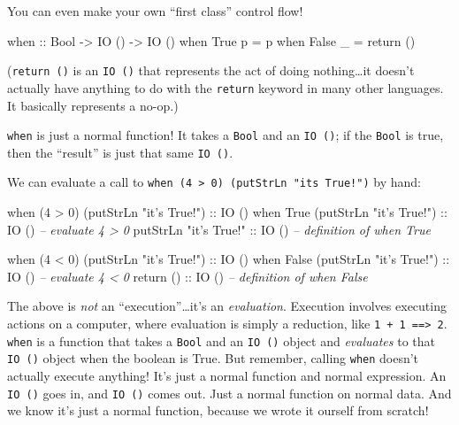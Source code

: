 \documentclass[]{article}
\newenvironment{Shaded}{\begin{snugshade}}{\end{snugshade}}
\newcommand{\CommentTok}[1]{\textcolor[rgb]{0.56,0.35,0.01}{\textit{#1}}}
\newcommand{\DataTypeTok}[1]{\textcolor[rgb]{0.13,0.29,0.53}{#1}}
\newcommand{\DecValTok}[1]{\textcolor[rgb]{0.00,0.00,0.81}{#1}}
\newcommand{\FunctionTok}[1]{\textcolor[rgb]{0.00,0.00,0.00}{#1}}
\newcommand{\NormalTok}[1]{#1}
\newcommand{\OtherTok}[1]{\textcolor[rgb]{0.56,0.35,0.01}{#1}}
\newcommand{\StringTok}[1]{\textcolor[rgb]{0.31,0.60,0.02}{#1}}
\begin{document}
You can even make your own ``first class'' control flow!

\begin{Shaded}
\begin{Highlighting}[]
\OtherTok{when ::} \DataTypeTok{Bool} \OtherTok{->} \DataTypeTok{IO}\NormalTok{ () }\OtherTok{->} \DataTypeTok{IO}\NormalTok{ ()}
\NormalTok{when }\DataTypeTok{True}\NormalTok{  p }\FunctionTok{=}\NormalTok{ p}
\NormalTok{when }\DataTypeTok{False}\NormalTok{ _ }\FunctionTok{=}\NormalTok{ return ()}
\end{Highlighting}
\end{Shaded}

(\texttt{return\ ()} is an \texttt{IO\ ()} that represents the act of doing
nothing\ldots{}it doesn't actually have anything to do with the \texttt{return}
keyword in many other languages. It basically represents a no-op.)

\texttt{when} is just a normal function! It takes a \texttt{Bool} and an
\texttt{IO\ ()}; if the \texttt{Bool} is true, then the ``result'' is just that
same \texttt{IO\ ()}.

We can evaluate a call to
\texttt{when\ (4\ \textgreater{}\ 0)\ (putStrLn\ "it\textquotesingle{}s\ True!")}
by hand:

\begin{Shaded}
\begin{Highlighting}[]
\NormalTok{when (}\DecValTok{4} \FunctionTok{>} \DecValTok{0}\NormalTok{) (putStrLn }\StringTok{"it's True!"}\NormalTok{)}\OtherTok{ ::} \DataTypeTok{IO}\NormalTok{ ()}
\NormalTok{when }\DataTypeTok{True}\NormalTok{ (putStrLn }\StringTok{"it's True!"}\NormalTok{)}\OtherTok{    ::} \DataTypeTok{IO}\NormalTok{ ()  }\CommentTok{-- evaluate 4 > 0}
\NormalTok{putStrLn }\StringTok{"it's True!"}\OtherTok{                ::} \DataTypeTok{IO}\NormalTok{ ()  }\CommentTok{-- definition of when True}

\NormalTok{when (}\DecValTok{4} \FunctionTok{<} \DecValTok{0}\NormalTok{) (putStrLn }\StringTok{"it's True!"}\NormalTok{)}\OtherTok{ ::} \DataTypeTok{IO}\NormalTok{ ()}
\NormalTok{when }\DataTypeTok{False}\NormalTok{ (putStrLn }\StringTok{"it's True!"}\NormalTok{)}\OtherTok{   ::} \DataTypeTok{IO}\NormalTok{ ()  }\CommentTok{-- evaluate 4 < 0}
\NormalTok{return}\OtherTok{ ()                            ::} \DataTypeTok{IO}\NormalTok{ ()  }\CommentTok{-- definition of when False}
\end{Highlighting}
\end{Shaded}

The above is \emph{not} an ``execution''\ldots{}it's an \emph{evaluation}.
Execution involves executing actions on a computer, where evaluation is simply a
reduction, like \texttt{1\ +\ 1\ ==\textgreater{}\ 2}. \texttt{when} is a
function that takes a \texttt{Bool} and an \texttt{IO\ ()} object and
\emph{evaluates} to that \texttt{IO\ ()} object when the boolean is True. But
remember, calling \texttt{when} doesn't actually execute anything! It's just a
normal function and normal expression. An \texttt{IO\ ()} goes in, and
\texttt{IO\ ()} comes out. Just a normal function on normal data. And we know
it's just a normal function, because we wrote it ourself from scratch!
\end{document}
